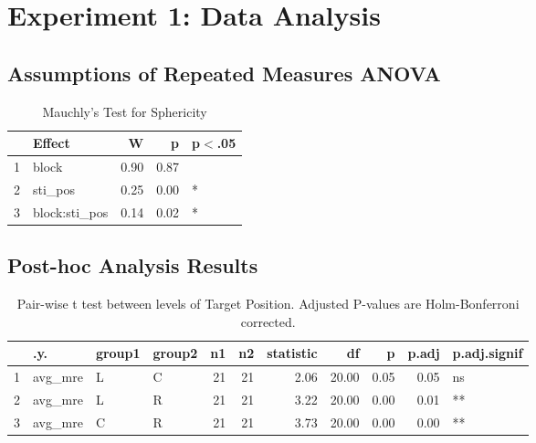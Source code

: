 \chapter{Experiment 1: Data Analysis} 
\label{App-exp1-analysis} 

\section{Assumptions of Repeated Measures ANOVA}

\begin{table}[H]
\centering
\begin{tabular}{rlrrl}
  \hline
 & Effect & W & p & p$<$.05 \\ 
  \hline
1 & block & 0.90 & 0.87 &  \\ 
  2 & sti\_pos & 0.25 & 0.00 & * \\ 
  3 & block:sti\_pos & 0.14 & 0.02 & * \\ 
   \hline
\end{tabular}
\caption{Mauchly's Test for Sphericity}
\label{}
\end{table}

\begin{table}[H]
\centering
{}
\caption{Spericity Corrections}
\label{}
\end{table}

\section{Post-hoc Analysis Results}

\begin{table}[H]
\centering
\begin{tabular}{rlllrrrrrrl}
  \hline
 & .y. & group1 & group2 & n1 & n2 & statistic & df & p & p.adj & p.adj.signif \\ 
  \hline
1 & avg\_mre & L & C &  21 &  21 & 2.06 & 20.00 & 0.05 & 0.05 & ns \\ 
  2 & avg\_mre & L & R &  21 &  21 & 3.22 & 20.00 & 0.00 & 0.01 & ** \\ 
  3 & avg\_mre & C & R &  21 &  21 & 3.73 & 20.00 & 0.00 & 0.00 & ** \\ 
   \hline
\end{tabular}
\caption{Pair-wise t test between levels of Target Position. Adjusted P-values are Holm-Bonferroni corrected.}
\end{table}



